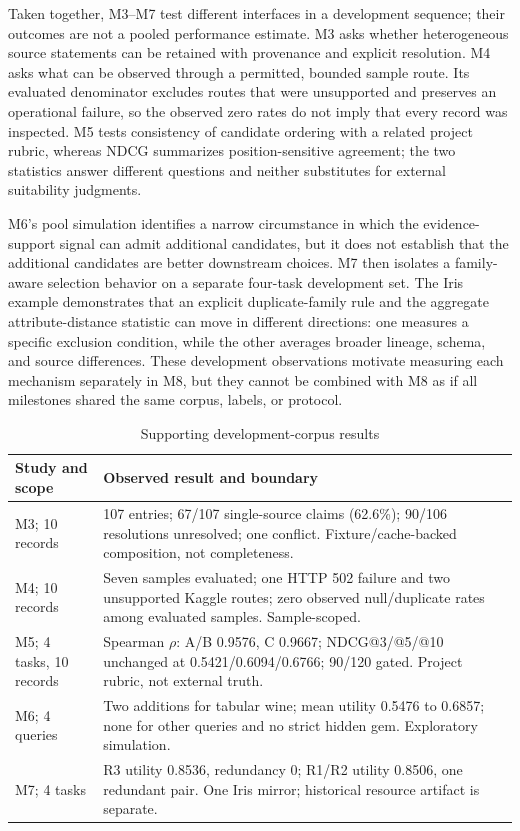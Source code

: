 \documentclass[conference]{IEEEtran}
\begin{document}
Taken together, M3--M7 test different interfaces in a development sequence; their outcomes are not a pooled performance estimate. M3 asks whether heterogeneous source statements can be retained with provenance and explicit resolution. M4 asks what can be observed through a permitted, bounded sample route. Its evaluated denominator excludes routes that were unsupported and preserves an operational failure, so the observed zero rates do not imply that every record was inspected. M5 tests consistency of candidate ordering with a related project rubric, whereas NDCG summarizes position-sensitive agreement; the two statistics answer different questions and neither substitutes for external suitability judgments.

M6's pool simulation identifies a narrow circumstance in which the evidence-support signal can admit additional candidates, but it does not establish that the additional candidates are better downstream choices. M7 then isolates a family-aware selection behavior on a separate four-task development set. The Iris example demonstrates that an explicit duplicate-family rule and the aggregate attribute-distance statistic can move in different directions: one measures a specific exclusion condition, while the other averages broader lineage, schema, and source differences. These development observations motivate measuring each mechanism separately in M8, but they cannot be combined with M8 as if all milestones shared the same corpus, labels, or protocol.

\begin{table}[t]
\caption{Supporting development-corpus results}
\label{tab:development}
\centering
\footnotesize
\begin{tabularx}{\columnwidth}{p{0.88in}X}
\toprule
Study and scope & Observed result and boundary\\
\midrule
M3; 10 records & 107 entries; 67/107 single-source claims (62.6\%); 90/106 resolutions unresolved; one conflict. Fixture/cache-backed composition, not completeness.\\
M4; 10 records & Seven samples evaluated; one HTTP 502 failure and two unsupported Kaggle routes; zero observed null/duplicate rates among evaluated samples. Sample-scoped.\\
M5; 4 tasks, 10 records & Spearman $\rho$: A/B 0.9576, C 0.9667; NDCG@3/@5/@10 unchanged at 0.5421/0.6094/0.6766; 90/120 gated. Project rubric, not external truth.\\
M6; 4 queries & Two additions for tabular wine; mean utility 0.5476 to 0.6857; none for other queries and no strict hidden gem. Exploratory simulation.\\
M7; 4 tasks & R3 utility 0.8536, redundancy 0; R1/R2 utility 0.8506, one redundant pair. One Iris mirror; historical resource artifact is separate.\\
\bottomrule
\end{tabularx}
\end{table}
\FloatBarrier
\end{document}
